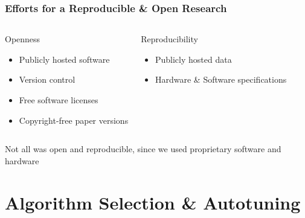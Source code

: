 \documentclass[10pt, compress, aspectratio=169]{beamer}
\begin{document}
\begin{frame}
    \frametitle{Efforts for a Reproducible \& Open Research}
    \begin{columns}[t]
            \begin{block}{Openness}
                \begin{itemize}
                    \item Publicly hosted software
                    \item Version control
                    \item Free software licenses
                    \item Copyright-free paper versions
                \end{itemize}
            \end{block}

            \begin{block}{Reproducibility}
                \begin{itemize}
                    \item Publicly hosted data
                    \item Hardware \& Software specifications
                \end{itemize}
            \end{block}

    \end{columns}

    \pause

    \begin{center}
        Not all was open and reproducible, since we used proprietary software
        and hardware
    \end{center}
\end{frame}

\section{Algorithm Selection \& Autotuning}
\end{document}
